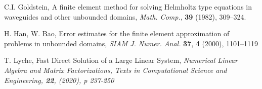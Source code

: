 \documentclass[a4paper]{article}
\theoremstyle{remark}
\begin{document}
\begin{thebibliography}{99}
  C.I. Goldstein, A finite element method for solving Helmholtz type equations in waveguides and other unbounded domains,
{\it Math. Comp.}, \textbf{39} (1982), 309–324.

  H. Han, W. Bao, Error estimates for the finite element approximation of problems in unbounded domains,
{\it SIAM J. Numer. Anal.} \textbf{37}, \textbf{4} (2000), 1101–1119

 T. Lyche, Fast Direct Solution of a Large Linear System,
\it{Numerical Linear Algebra and Matrix Factorizations, Texts in Computational Science and Engineering}, \textbf{22}, (2020), p 237-250 

\end{thebibliography}
\end{document}
